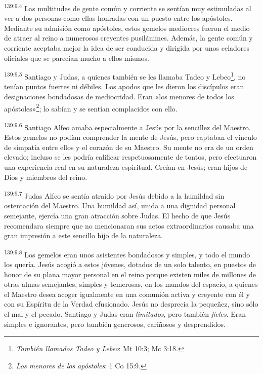 \par
\textsuperscript{139:9.4} Las multitudes de gente común y corriente se sentían muy estimuladas al ver a dos personas como ellas honradas con un puesto entre los apóstoles. Mediante su admisión como apóstoles, estos gemelos mediocres fueron el medio de atraer al reino a numerosos creyentes pusilánimes. Además, la gente común y corriente aceptaba mejor la idea de ser conducida y dirigida por unos celadores oficiales que se parecían mucho a ellos mismos.

\par
\textsuperscript{139:9.5} Santiago y Judas, a quienes también se les llamaba Tadeo y Lebeo\footnote{\textit{También llamados Tadeo y Lebeo}: Mt 10:3; Mc 3:18.}, no tenían puntos fuertes ni débiles. Los apodos que les dieron los discípulos eran designaciones bondadosas de mediocridad. Eran «los menores de todos los apóstoles»\footnote{\textit{Los menores de los apóstoles}: 1 Co 15:9.}; lo sabían y se sentían complacidos con ello.

\par
\textsuperscript{139:9.6} Santiago Alfeo amaba especialmente a Jesús por la sencillez del Maestro. Estos gemelos no podían comprender la mente de Jesús, pero captaban el vínculo de simpatía entre ellos y el corazón de su Maestro. Su mente no era de un orden elevado; incluso se les podría calificar respetuosamente de tontos, pero efectuaron una experiencia real en su naturaleza espiritual. Creían en Jesús; eran hijos de Dios y miembros del reino.

\par
\textsuperscript{139:9.7} Judas Alfeo se sentía atraído por Jesús debido a la humildad sin ostentación del Maestro. Una humildad así, unida a una dignidad personal semejante, ejercía una gran atracción sobre Judas. El hecho de que Jesús recomendara siempre que no mencionaran sus actos extraordinarios causaba una gran impresión a este sencillo hijo de la naturaleza.

\par
\textsuperscript{139:9.8} Los gemelos eran unos asistentes bondadosos y simples, y todo el mundo los quería. Jesús acogió a estos jóvenes, dotados de un solo talento, en puestos de honor de su plana mayor personal en el reino porque existen miles de millones de otras almas semejantes, simples y temerosas, en los mundos del espacio, a quienes el Maestro desea acoger igualmente en una comunión activa y creyente con él y con su Espíritu de la Verdad efusionado. Jesús no desprecia la pequeñez, sino sólo el mal y el pecado. Santiago y Judas eran \textit{limitados}, pero también \textit{fieles}. Eran simples e ignorantes, pero también generosos, cariñosos y desprendidos.

